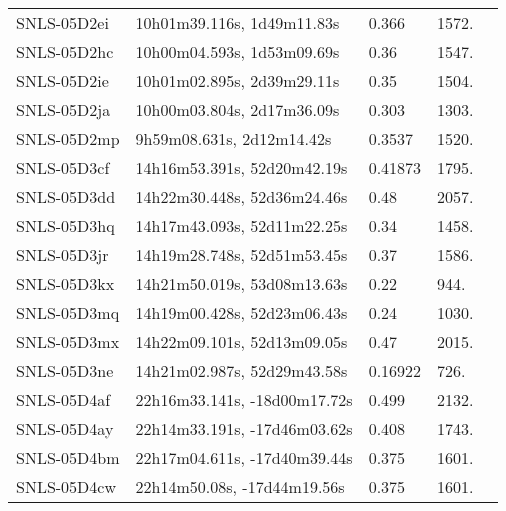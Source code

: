 \begin{longtable}{lllll}
      SNLS-05D2ei &     10h01m39.116s, 1d49m11.83s &    0.366 &          1572. &  \citet{2009AandA...507...85B} \\
      SNLS-05D2hc &     10h00m04.593s, 1d53m09.69s &     0.36 &          1547. &    \citet{2006AJ....132.1126N} \\
      SNLS-05D2ie &     10h01m02.895s, 2d39m29.11s &     0.35 &          1504. &    \citet{2006AJ....132.1126N} \\
      SNLS-05D2ja &     10h00m03.804s, 2d17m36.09s &    0.303 &          1303. &  \citet{2008AandA...477..717B} \\
      SNLS-05D2mp &      9h59m08.631s, 2d12m14.42s &   0.3537 &          1520. &    \citet{2008ApJ...674...51E} \\
      SNLS-05D3cf &    14h16m53.391s, 52d20m42.19s &  0.41873 &          1795. &    \citet{2007DEEP2.3...0000:} \\
      SNLS-05D3dd &    14h22m30.448s, 52d36m24.46s &     0.48 &          2057. &    \citet{2006AJ....132.1126N} \\
      SNLS-05D3hq &    14h17m43.093s, 52d11m22.25s &     0.34 &          1458. &    \citet{2006AJ....132.1126N} \\
      SNLS-05D3jr &    14h19m28.748s, 52d51m53.45s &     0.37 &          1586. &    \citet{2006AJ....132.1126N} \\
      SNLS-05D3kx &    14h21m50.019s, 53d08m13.63s &     0.22 &           944. &    \citet{2006AJ....132.1126N} \\
      SNLS-05D3mq &    14h19m00.428s, 52d23m06.43s &     0.24 &          1030. &    \citet{2006AJ....132.1126N} \\
      SNLS-05D3mx &    14h22m09.101s, 52d13m09.05s &     0.47 &          2015. &    \citet{2006AJ....132.1126N} \\
      SNLS-05D3ne &    14h21m02.987s, 52d29m43.58s &  0.16922 &           726. &    \citet{2004SDSS3.C...0000:} \\
      SNLS-05D4af &   22h16m33.141s, -18d00m17.72s &    0.499 &          2132. &  \citet{2009AandA...507...85B} \\
      SNLS-05D4ay &   22h14m33.191s, -17d46m03.62s &    0.408 &          1743. &  \citet{2009AandA...507...85B} \\
      SNLS-05D4bm &   22h17m04.611s, -17d40m39.44s &    0.375 &          1601. &  \citet{2008AandA...477..717B} \\
      SNLS-05D4cw &    22h14m50.08s, -17d44m19.56s &    0.375 &          1601. &  \citet{2009AandA...507...85B} \\

\end{longtable}
